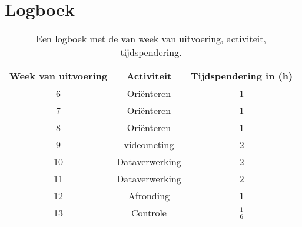 \documentclass[numbers=endperiod]{scrartcl}
\begin{document}
\section{Logboek}
\begin{table}[ht]
\centering
\caption{Een logboek met de van week van uitvoering, activiteit, tijdspendering.}
\begin{tabular}{Scc}
\toprule
{Week van uitvoering} & Activiteit & Tijdspendering in (\si{\hour})\\
 & Oriënteren & 1\\
7 & Oriënteren & 1\\
8 & Oriënteren & 1\\
9 & videometing & 2\\
10 & Dataverwerking & 2\\
11 & Dataverwerking & 2\\
12 & Afronding & 1\\
13 & Controle & $\frac{1}{6}$\\
\bottomrule
\end{tabular}
\end{table}
\end{document}
